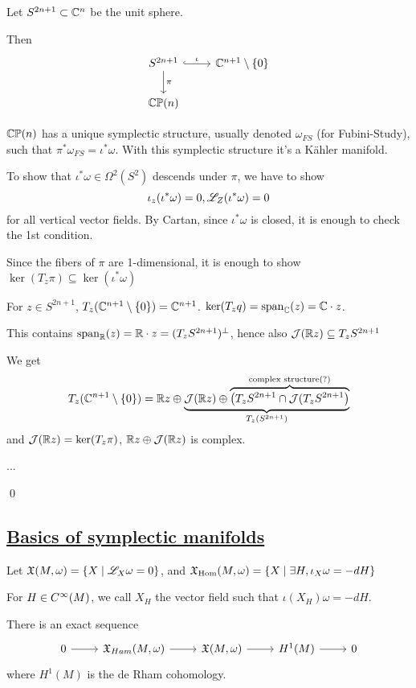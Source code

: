 \documentclass[x11names,reqno,14pt]{extarticle}
\newcommand{\mk}[1]{\mathfrak{#1}}
\DeclareMathOperator{\Span}{span}
\begin{document}
Let $S^{2n + 1} \subset \mathbb{C}^n$ be the unit sphere. 

Then 
\[
\begin{tikzcd}
\ar[d, "\pi"] S^{2n + 1} \ar[r, "\iota", hook] & \C^{n+1}\setminus\{0\} \\
\CP(n) & 
\end{tikzcd}
\]

\thm ${\mathbb{CP}}(n)$ has a unique symplectic structure, usually denoted $\omega_{FS}$ (for Fubini-Study), such that $\pi^*\omega_{FS} = \iota^*\omega$. With this symplectic structure it's a K\"ahler manifold. 

\proof

To show that $\iota^*\omega \in\Omega^2(S^2)$ descends under $\pi$, we have to show 
\[
\iota_z(\iota^*\omega) = 0, \mathscr{L}_Z(\iota^*\omega) = 0
\]
for all vertical vector fields. By Cartan, since $\iota^*\omega$ is closed, it is enough to check the 1st condition. 

Since the fibers of $\pi$ are 1-dimensional, it is enough to show $\ker(T_z\pi) \subseteq \ker(\iota^*\omega)$

For $z \in S^{2n+1}$, $T_z(\mathbb{C}^{n+1}\setminus\{0\}) = \mathbb{C}^{n+1}$. $\ker(T_zq) = \Span_{\C}(z) = \C\cdot z$.

This contains $\Span_{\R}(z) = \R\cdot z = (T_zS^{2n+1})^\perp$, hence also $\mathcal{J}(\mathbb{R} z)\subseteq T_zS^{2n+1}$

We get
\[
T_z(\mathbb{C}^{n+1}\setminus\{0\}) = \mathbb{R} z\oplus \underbrace{ \mathcal{J}(\mathbb{R} z) \oplus\overbrace{\left(T_zS^{2n+1} \cap \mathcal{J}(T_zS^{2n+1}\right)}^{\text{complex structure(?)}}}_{T_z(S^{2n+1})}
\]
and $\mathcal{J}(\mathbb{R} z) = \ker(T_z\pi)$, $\mathbb{R} z\oplus \mathcal{J}(\mathbb{R} z)$ is complex. 

...

\qed

\subsection*{\underline{Basics of symplectic manifolds}}

Let $\mk{X}(M,\omega) = \{X \mid \ms{L}_X\omega = 0\}$, and $\mk{X}_{\Hom}(M,\omega) = \{X \mid \exists H, \iota_X\omega = -dH\}$

For $H \in C^\infty(M)$, we call $X_H$ the vector field such that $\iota(X_H)\omega = -dH$.

\prop

There is an exact sequence
\[
\exactshort{\mk{X}_{Ham}(M,\omega)}{}{\mk{X}(M,\omega)}{}{H^1(M)}
\]
where $H^1(M)$ is the de Rham cohomology.
\end{document}
